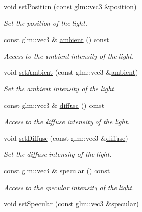 \begin{DoxyCompactItemize}
void \hyperlink{classPointLight_a17a969466c4c0fafca34f45b8984c11b}{set\+Position} (const glm\+::vec3 \&\hyperlink{classPointLight_a46ba05eb1117e13cf078fa0fe4d1579f}{position})
\begin{DoxyCompactList}\small\item\em Set the position of the light. \end{DoxyCompactList}\item 
const glm\+::vec3 \& \hyperlink{classPointLight_a80a915d16e9b7576107ce23318c0d547}{ambient} () const 
\begin{DoxyCompactList}\small\item\em Access to the ambient intensity of the light. \end{DoxyCompactList}\item 
void \hyperlink{classPointLight_adfb7c1860bdf0c2311a148fd0045cea7}{set\+Ambient} (const glm\+::vec3 \&\hyperlink{classPointLight_a80a915d16e9b7576107ce23318c0d547}{ambient})
\begin{DoxyCompactList}\small\item\em Set the ambient intensity of the light. \end{DoxyCompactList}\item 
const glm\+::vec3 \& \hyperlink{classPointLight_a35474dabe9643e96eff5447f14b41a7b}{diffuse} () const 
\begin{DoxyCompactList}\small\item\em Access to the diffuse intensity of the light. \end{DoxyCompactList}\item 
void \hyperlink{classPointLight_a85de8464abaf20336e9f98f7ad48a638}{set\+Diffuse} (const glm\+::vec3 \&\hyperlink{classPointLight_a35474dabe9643e96eff5447f14b41a7b}{diffuse})
\begin{DoxyCompactList}\small\item\em Set the diffuse intensity of the light. \end{DoxyCompactList}\item 
const glm\+::vec3 \& \hyperlink{classPointLight_aedd6ede28b41d05e277c26fcbfa1657d}{specular} () const 
\begin{DoxyCompactList}\small\item\em Access to the specular intensity of the light. \end{DoxyCompactList}\item 
void \hyperlink{classPointLight_a7265b55493251009964a44debc40d85d}{set\+Specular} (const glm\+::vec3 \&\hyperlink{classPointLight_aedd6ede28b41d05e277c26fcbfa1657d}{specular})

\end{DoxyCompactItemize}

